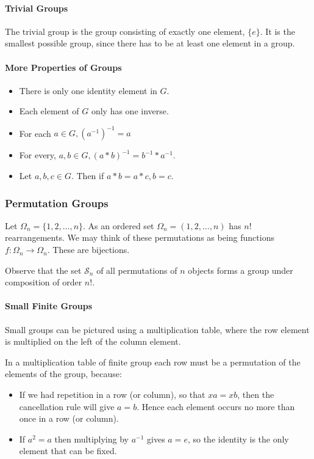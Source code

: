 \paragraph{Trivial Groups}
The trivial group is the group consisting of exactly one element, \(\{e\}\). It is the smallest possible group, since there has to be at least one element in a group.

\paragraph{More Properties of Groups}
\begin{itemize}
    \item There is only one identity element in \(G\).
    \item Each element of \(G\) only has one inverse.
    \item For each \(a \in G, (a^{-1})^{-1} = a\)
    \item For every, \(a,b \in G, (a *  b)^{-1} = b^{-1} * a^{-1}\).
    \item Let \(a,b,c \in G\). Then if \(a * b = a * c, b = c\).
\end{itemize}

\subsubsection{Permutation Groups}
Let \(\Omega_n = \{1,2,\dots,n\}\). As an ordered set \(\Omega_n = (1,2,\dots,n)\) has \(n!\) rearrangements. We may think of these permutations as being functions \(f:\Omega_n \to \Omega_n\). These are bijections.

Observe that the set \(\mathcal{S}_n\) of all permutations of \(n\) objects forms a group under composition of order \(n!\).

\paragraph{Small Finite Groups}
Small groups can be pictured using a multiplication table, where the row element is multiplied on the left of the column element.

In a multiplication table of finite group each row must be a permutation of the elements of the group, because:
\begin{itemize}
    \item If we had repetition in a row (or column), so that \(xa = xb\), then the cancellation rule will give \(a=b\). Hence each element occurs no more than once in a row (or column).
    \item If \(a^2 = a\) then multiplying by \(a^{-1}\) gives \(a=e\), so the identity is the only element that can be fixed.
\end{itemize}

